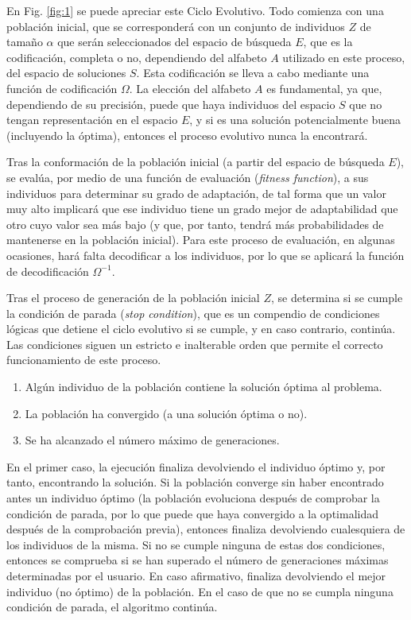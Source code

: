 \documentclass[spanish,a4paper,12pt,twoside]{report}
\begin{document}
  En Fig. \ref{fig:1} se puede apreciar este Ciclo Evolutivo. Todo comienza con una población inicial, que se corresponderá con un conjunto de individuos $Z$ de tamaño $\alpha$ que serán seleccionados del espacio de búsqueda $E$, que es la codificación, completa o no, dependiendo del alfabeto $A$ utilizado en este proceso, del espacio de soluciones $S$. Esta codificación se lleva a cabo mediante una función de codificación $\Omega$. La elección del alfabeto $A$ es fundamental, ya que, dependiendo de su precisión, puede que haya individuos del espacio $S$ que no tengan representación en el espacio $E$, y si es una solución potencialmente buena (incluyendo la óptima), entonces el proceso evolutivo nunca la encontrará. \par
  Tras la conformación de la población inicial (a partir del espacio de búsqueda $E$), se evalúa, por medio de una función de evaluación (\emph{fitness function}), a sus individuos para determinar su grado de adaptación, de tal forma que un valor muy alto implicará que ese individuo tiene un grado mejor de adaptabilidad que otro cuyo valor sea más bajo (y que, por tanto, tendrá más probabilidades de mantenerse en la población inicial). Para este proceso de evaluación, en algunas ocasiones, hará falta decodificar a los individuos, por lo que se aplicará la función de decodificación $\Omega^{-1}$. \par \vfill
  Tras el proceso de generación de la población inicial $Z$, se determina si se cumple la condición de parada (\emph{stop condition}), que es un compendio de condiciones lógicas que detiene el ciclo evolutivo si se cumple, y en caso contrario, continúa. Las condiciones siguen un estricto e inalterable orden que permite el correcto funcionamiento de este proceso.
  \begin{enumerate}
    \item Algún individuo de la población contiene la solución óptima al problema.
    \item La población ha convergido (a una solución óptima o no).
    \item Se ha alcanzado el número máximo de generaciones.
  \end{enumerate} \par
  En el primer caso, la ejecución finaliza devolviendo el individuo óptimo y, por tanto, encontrando la solución. Si la población converge sin haber encontrado antes un individuo óptimo (la población evoluciona después de comprobar la condición de parada, por lo que puede que haya convergido a la optimalidad después de la comprobación previa), entonces finaliza devolviendo cualesquiera de los individuos de la misma. Si no se cumple ninguna de estas dos condiciones, entonces se comprueba si se han superado el número de generaciones máximas determinadas por el usuario. En caso afirmativo, finaliza devolviendo el mejor individuo (no óptimo) de la población. En el caso de que no se cumpla ninguna condición de parada, el algoritmo continúa. \par
\end{document}
